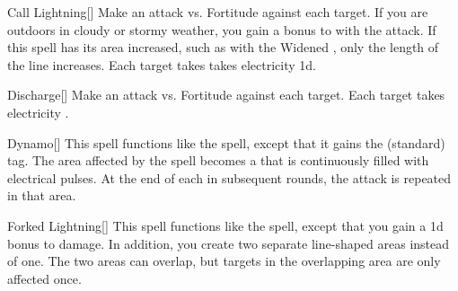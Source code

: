 \lowercase{\hypertarget{spell:Call Lightning}{}}\label{spell:Call Lightning}
\begin{freeability}[Rank 3]{\hypertarget{spell:Call Lightning}{Call Lightning}}[]
Make an attack vs. Fortitude against each target.
If you are outdoors in cloudy or stormy weather, you gain a  bonus to  with the attack.
If this spell has its area increased, such as with the Widened , only the length of the line increases.
\hit Each target takes takes electricity  \plus1d.
\end{freeability}
\vspace{0.25em}



\lowercase{\hypertarget{spell:Discharge}{}}\label{spell:Discharge}
\begin{freeability}[Rank 3]{\hypertarget{spell:Discharge}{Discharge}}[]
Make an attack vs. Fortitude against each target.
\hit Each target takes electricity .
\end{freeability}
\vspace{0.25em}



\lowercase{\hypertarget{spell:Dynamo}{}}\label{spell:Dynamo}
\begin{freeability}[Rank 3]{\hypertarget{spell:Dynamo}{Dynamo}}[]
This spell functions like the  spell, except that it gains the  (standard) tag.
The area affected by the spell becomes a  that is continuously filled with electrical pulses.
At the end of each  in subsequent rounds, the attack is repeated in that area.
\end{freeability}
\vspace{0.25em}



\lowercase{\hypertarget{spell:Forked Lightning}{}}\label{spell:Forked Lightning}
\begin{freeability}[Rank 3]{\hypertarget{spell:Forked Lightning}{Forked Lightning}}[]
This spell functions like the  spell, except that you gain a \plus1d bonus to damage.
In addition, you create two separate line-shaped areas instead of one.
The two areas can overlap, but targets in the overlapping area are only affected once.
\end{freeability}
\vspace{0.25em}



